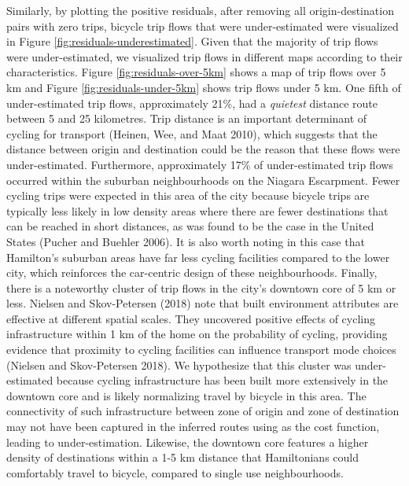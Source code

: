 \documentclass[smallextended]{svjour3}       %
\begin{document}
Similarly, by plotting the positive residuals, after removing all
origin-destination pairs with zero trips, bicycle trip flows that were
under-estimated were visualized in Figure
\ref{fig:residuals-underestimated}. Given that the majority of trip
flows were under-estimated, we visualized trip flows in different maps
according to their characteristics. Figure \ref{fig:residuals-over-5km}
shows a map of trip flows over 5 km and Figure
\ref{fig:residuals-under-5km} shows trip flows under 5 km. One fifth of
under-estimated trip flows, approximately 21\%, had a \emph{quietest}
distance route between 5 and 25 kilometres. Trip distance is an
important determinant of cycling for transport (Heinen, Wee, and Maat
2010), which suggests that the distance between origin and destination
could be the reason that these flows were under-estimated. Furthermore,
approximately 17\% of under-estimated trip flows occurred within the
suburban neighbourhoods on the Niagara Escarpment. Fewer cycling trips
were expected in this area of the city because bicycle trips are
typically less likely in low density areas where there are fewer
destinations that can be reached in short distances, as was found to be
the case in the United States (Pucher and Buehler 2006). It is also
worth noting in this case that Hamilton's suburban areas have far less
cycling facilities compared to the lower city, which reinforces the
car-centric design of these neighbourhoods. Finally, there is a
noteworthy cluster of trip flows in the city's downtown core of 5 km or
less. Nielsen and Skov-Petersen (2018) note that built environment
attributes are effective at different spatial scales. They uncovered
positive effects of cycling infrastructure within 1 km of the home on
the probability of cycling, providing evidence that proximity to cycling
facilities can influence transport mode choices (Nielsen and
Skov-Petersen 2018). We hypothesize that this cluster was
under-estimated because cycling infrastructure has been built more
extensively in the downtown core and is likely normalizing travel by
bicycle in this area. The connectivity of such infrastructure between
zone of origin and zone of destination may not have been captured in the
inferred routes using as the cost function, leading to under-estimation.
Likewise, the downtown core features a higher density of destinations
within a 1-5 km distance that Hamiltonians could comfortably travel to
bicycle, compared to single use neighbourhoods.
\end{document}
